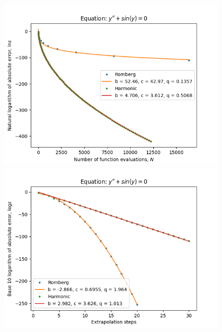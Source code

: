 \begin{figure}[H]
\centering
\begin{minipage}{0.45\textwidth}
\centering
\includegraphics[scale=0.45]{../results/emr_plots/oscillation_hp_trend.png}
\end{minipage}
\begin{minipage}{0.45\textwidth}
\centering
\includegraphics[scale=0.45]{../results/emr_plots/oscillation_hp_steps.png}
\end{minipage}
\end{figure}

